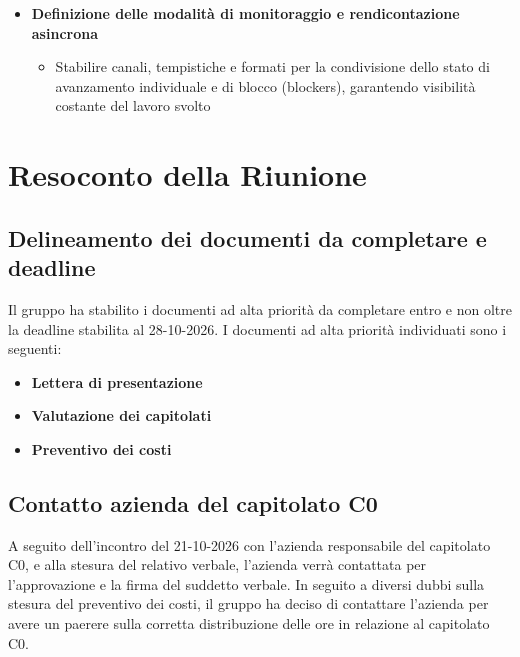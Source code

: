 \documentclass[11pt, a4paper]{article}
\begin{document}
\begin{itemize}
        \begin{itemize}
            \item Individuazione di fasce orarie fisse e ricorrenti per gli incontri di allineamento interno e per gli stati di avanzamento con gli stakeholder esterni
        \end{itemize}
    \item \textbf{Definizione delle modalità di monitoraggio e rendicontazione asincrona}
        \begin{itemize}
            \item Stabilire canali, tempistiche e formati per la condivisione dello stato di avanzamento individuale e di blocco (blockers), garantendo visibilità costante del lavoro svolto
        \end{itemize}
\end{itemize}

\section{Resoconto della Riunione}

\subsection{Delineamento dei documenti da completare e deadline}
Il gruppo ha stabilito i documenti ad alta priorità da completare entro e non oltre la deadline stabilita al 28-10-2026. I documenti ad alta priorità individuati sono i seguenti:
\begin{itemize}
    \item \textbf{Lettera di presentazione}
    \item \textbf{Valutazione dei capitolati} 
    \item \textbf{Preventivo dei costi}
\end{itemize}

\subsection{Contatto azienda del capitolato C0}
A seguito dell'incontro del 21-10-2026 con l'azienda responsabile del capitolato C0, e alla stesura del relativo verbale, l'azienda verrà contattata per l'approvazione e la firma del suddetto verbale. In seguito a diversi dubbi sulla stesura del preventivo dei costi, il gruppo ha deciso di contattare l'azienda per avere un paerere sulla corretta distribuzione delle ore in relazione al capitolato C0.
\end{document}
